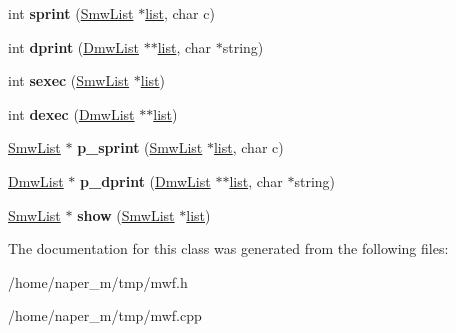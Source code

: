 \begin{DoxyCompactItemize}
\item 
\hypertarget{class_mw_1_1_list_a46c0fc425e32c2fff9d8f767c8dcebdf}{int {\bfseries sprint} (\hyperlink{struct_mw__list}{Smw\-List} $\ast$\hyperlink{structa__list}{list}, char c)}\label{class_mw_1_1_list_a46c0fc425e32c2fff9d8f767c8dcebdf}

\item 
\hypertarget{class_mw_1_1_list_af23c50c8cdf2e33724be1715c1bfc4ce}{int {\bfseries dprint} (\hyperlink{structd__mw__list}{Dmw\-List} $\ast$$\ast$\hyperlink{structa__list}{list}, char $\ast$string)}\label{class_mw_1_1_list_af23c50c8cdf2e33724be1715c1bfc4ce}

\item 
\hypertarget{class_mw_1_1_list_add03f9e9922b8adf21c45fb2f6619f17}{int {\bfseries sexec} (\hyperlink{struct_mw__list}{Smw\-List} $\ast$\hyperlink{structa__list}{list})}\label{class_mw_1_1_list_add03f9e9922b8adf21c45fb2f6619f17}

\item 
\hypertarget{class_mw_1_1_list_aec1e3cd9f11c606516292464c195f39a}{int {\bfseries dexec} (\hyperlink{structd__mw__list}{Dmw\-List} $\ast$$\ast$\hyperlink{structa__list}{list})}\label{class_mw_1_1_list_aec1e3cd9f11c606516292464c195f39a}

\item 
\hypertarget{class_mw_1_1_list_a75dec13331682ae2ba723174abfec39b}{\hyperlink{struct_mw__list}{Smw\-List} $\ast$ {\bfseries p\-\_\-sprint} (\hyperlink{struct_mw__list}{Smw\-List} $\ast$\hyperlink{structa__list}{list}, char c)}\label{class_mw_1_1_list_a75dec13331682ae2ba723174abfec39b}

\item 
\hypertarget{class_mw_1_1_list_a8b9ba1d2486d49f897b42121f7396c3e}{\hyperlink{structd__mw__list}{Dmw\-List} $\ast$ {\bfseries p\-\_\-dprint} (\hyperlink{structd__mw__list}{Dmw\-List} $\ast$$\ast$\hyperlink{structa__list}{list}, char $\ast$string)}\label{class_mw_1_1_list_a8b9ba1d2486d49f897b42121f7396c3e}

\item 
\hypertarget{class_mw_1_1_list_a84530aed7bb0f617e71512d8651c6703}{\hyperlink{struct_mw__list}{Smw\-List} $\ast$ {\bfseries show} (\hyperlink{struct_mw__list}{Smw\-List} $\ast$\hyperlink{structa__list}{list})}\label{class_mw_1_1_list_a84530aed7bb0f617e71512d8651c6703}

\end{DoxyCompactItemize}


The documentation for this class was generated from the following files\-:\begin{DoxyCompactItemize}
\item 
/home/naper\-\_\-m/tmp/mwf.\-h\item 
/home/naper\-\_\-m/tmp/mwf.\-cpp\end{DoxyCompactItemize}
